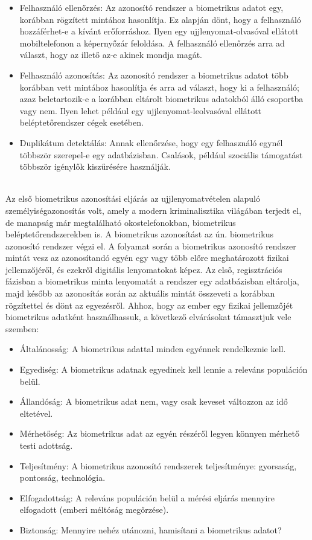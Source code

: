 \begin{itemize}
	\item Felhasználó ellenőrzés: Az azonosító rendszer a biometrikus adatot egy, korábban rögzített mintához hasonlítja. Ez alapján dönt, hogy a felhasználó hozzáférhet-e a kívánt erőforráshoz. Ilyen egy ujjlenyomat-olvasóval ellátott mobiltelefonon a képernyőzár feloldása. A felhasználó ellenőrzés arra ad választ, hogy az illető az-e akinek mondja magát.
	\item Felhasználó azonosítás: Az azonosító rendszer a biometrikus adatot több korábban vett mintához hasonlítja és arra ad választ, hogy ki a felhasználó; azaz beletartozik-e a korábban eltárolt biometrikus adatokból álló csoportba vagy nem. Ilyen lehet például egy ujjlenyomat-leolvasóval ellátott beléptetőrendszer cégek esetében.
	\item Duplikátum detektálás: Annak ellenőrzése, hogy egy felhasználó egynél többször szerepel-e egy adatbázisban. Csalások, például szociális támogatást többször igénylők kiszűrésére használják.
\end{itemize}
\ \\
Az első biometrikus azonosítási eljárás az ujjlenyomatvételen alapuló személyiségazonosítás volt, amely a modern kriminalisztika világában terjedt el, de manapság már megtalálható okostelefonokban, biometrikus beléptetőrendszerekben is.
\newline
\newline
A biometrikus azonosítást az ún. biometrikus azonosító rendszer végzi el. A folyamat során a biometrikus azonosító rendszer mintát vesz az azonosítandó egyén egy vagy több előre meghatározott fizikai jellemzőjéről, és ezekről digitális lenyomatokat képez. Az első, regisztrációs fázisban a biometrikus minta lenyomatát a rendszer egy adatbázisban eltárolja, majd később az azonosítás során az aktuális mintát összeveti a korábban rögzítettel és dönt az egyezésről. Ahhoz, hogy az ember egy fizikai jellemzőjét biometrikus adatként használhassuk, a következő elvárásokat támasztjuk vele szemben:

\begin{itemize}
	\item Általánosság: A biometrikus adattal minden egyénnek rendelkeznie kell.
	\item Egyediség: A biometrikus adatnak egyedinek kell lennie a releváns populáción belül.
	\item Állandóság: A biometrikus adat nem, vagy csak keveset változzon az idő eltetével.
	\item Mérhetőség: Az biometrikus adat az egyén részéről legyen könnyen mérhető testi adottság.
	\item Teljesítmény: A biometrikus azonosító rendszerek teljesítménye: gyorsaság, pontosság, technológia.
	\item Elfogadottság: A releváns populáción belül a mérési eljárás mennyire elfogadott (emberi méltóság megőrzése).
	\item Biztonság: Mennyire nehéz utánozni, hamisítani a biometrikus adatot?
\end{itemize}

